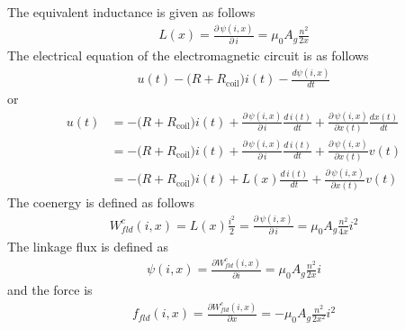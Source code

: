 \documentclass[12pt,a4paper,oneside]{book}
\begin{document}
\begin{onehalfspace}
\begin{example}
\begin{equation}
\begin{aligned}
	\end{aligned}
\end{equation}
The equivalent inductance is given as follows
\begin{equation}\label{example_8}	
	\begin{aligned}
		L(x) = \frac{\partial\,\psi\left(i,x\right)}{\partial\,i} = \mu_0A_g\frac{n^2}{2x} 
	\end{aligned}
\end{equation}
The electrical equation of the electromagnetic circuit is as follows
\begin{equation}\label{example_9}	
	\begin{aligned}
		u(t) - \big(R+R_{\text{coil}}\big)i(t) -\frac{d\psi(i,x)}{dt}
	\end{aligned}
\end{equation}
or
\begin{equation}\label{example_10}	
	\begin{aligned}
		u(t) &= -\big(R+R_{\text{coil}}\big)i(t) + \frac{\partial\,\psi(i,x)}{\partial\,i}\frac{d\,i(t)}{dt} + \frac{\partial\,\psi(i,x)}{\partial x(t)}\frac{dx(t)}{dt} \\[8pt]
		&= -\big(R+R_{\text{coil}}\big)i(t) + \frac{\partial\,\psi(i,x)}{\partial\,i}\frac{d\,i(t)}{dt} + \frac{\partial\,\psi(i,x)}{\partial x(t)}v(t) \\[8pt]
		&= -\big(R+R_{\text{coil}}\big)i(t) + L(x)\frac{d\,i(t)}{dt} + \frac{\partial\,\psi(i,x)}{\partial x(t)}v(t)
	\end{aligned}
\end{equation}
The coenergy is defined as follows
\begin{equation}\label{example_11}	
	\begin{aligned}
		W_{fld}^c(i,x)=L(x)\frac{i^2}{2} = \frac{\partial\,\psi\left(i,x\right)}{\partial\,i} = \mu_0A_g\frac{n^2}{4x} i^2
	\end{aligned}
\end{equation}
The linkage flux is defined as
\begin{equation}\label{example_12}	
	\begin{aligned}
		\psi(i,x)=\frac{\partial W_{fld}^c(i,x)}{\partial i}= \mu_0A_g\frac{n^2}{2x} i
	\end{aligned}
\end{equation}
and the force is 
\begin{equation}\label{example_13}	
	\begin{aligned}
		f_{fld}(i,x)=\frac{\partial W_{fld}^c(i,x)}{\partial x}= -\mu_0A_g\frac{n^2}{2x^2} i^2

\end{aligned}
\end{equation}
\end{example}
\end{onehalfspace}
\end{document}
